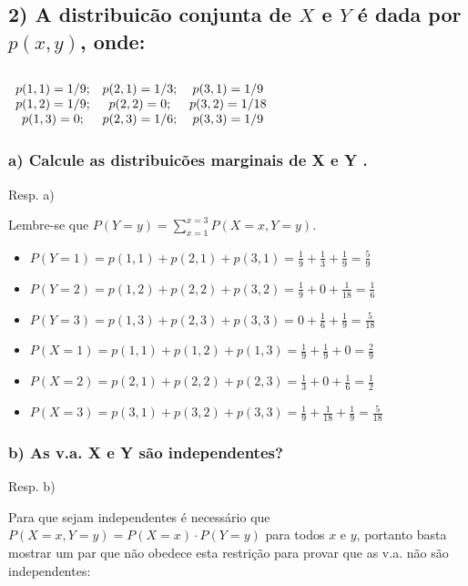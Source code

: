 \documentclass[english]{article}
\begin{document}
\textbf{\textcompwordmark{}}


\subsection*{\textmd{2) A distribuicão conjunta de $X$ e $Y$ é dada por $p(x,y)$,
onde:}}


\subsection*{\textmd{$\protect\begin{array}{ccc}
p(1,1)=1/9; & p(2,1)=1/3; & p(3,1)=1/9\protect\\
p(1,2)=1/9; & p(2,2)=0; & p(3,2)=1/18\protect\\
p(1,3)=0; & p(2,3)=1/6; & p(3,3)=1/9
\protect\end{array}$ }}


\subsubsection*{\textmd{a) Calcule as distribuicões marginais de X e Y . }}

Resp. a)

Lembre-se que $P(Y=y)=\sum_{x=1}^{x=3}P(X=x,Y=y)$.
\begin{itemize}
\item $P(Y=1)=p(1,1)+p(2,1)+p(3,1)=\frac{1}{9}+\frac{1}{3}+\frac{1}{9}=\frac{5}{9}$
\item $P(Y=2)=p(1,2)+p(2,2)+p(3,2)=\frac{1}{9}+0+\frac{1}{18}=\frac{1}{6}$
\item $P(Y=3)=p(1,3)+p(2,3)+p(3,3)=0+\frac{1}{6}+\frac{1}{9}=\frac{5}{18}$
\item $P(X=1)=p(1,1)+p(1,2)+p(1,3)=\frac{1}{9}+\frac{1}{9}+0=\frac{2}{9}$
\item $P(X=2)=p(2,1)+p(2,2)+p(2,3)=\frac{1}{3}+0+\frac{1}{6}=\frac{1}{2}$
\item $P(X=3)=p(3,1)+p(3,2)+p(3,3)=\frac{1}{9}+\frac{1}{18}+\frac{1}{9}=\frac{5}{18}$
\end{itemize}

\subsubsection*{\textmd{b) As v.a. X e Y são independentes? }}

Resp. b) 

Para que sejam independentes é necessário que $P(X=x,Y=y)=P(X=x)\cdot P(Y=y)$
para todos $x$ e $y$, portanto basta mostrar um par que não obedece
esta restrição para provar que as v.a. não são independentes:
\end{document}
